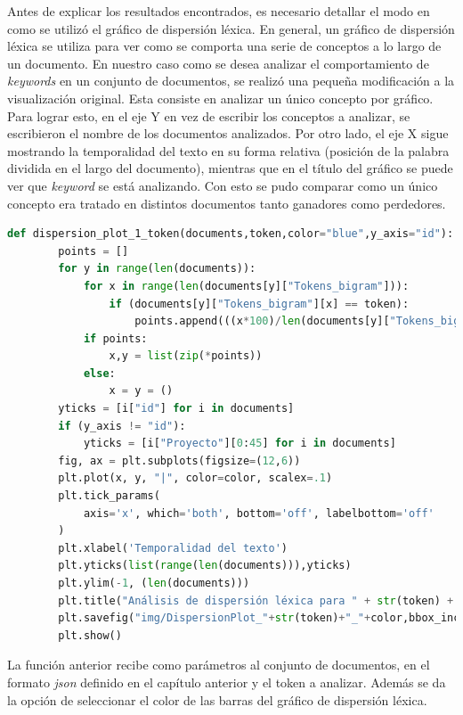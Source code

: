     Antes de explicar los resultados encontrados, es necesario detallar el modo en como se utilizó el gráfico de dispersión léxica. En general, un gráfico de dispersión léxica se utiliza para ver como se comporta una serie de conceptos a lo largo de un documento. En nuestro caso como se desea analizar el comportamiento de \textit{keywords} en un conjunto de documentos, se realizó una pequeña modificación a la visualización original. Esta consiste en analizar un único concepto por gráfico. Para lograr esto, en el eje Y en vez de escribir los conceptos a analizar, se escribieron el nombre de los documentos analizados. Por otro lado, el eje X sigue mostrando la temporalidad del texto en su forma relativa (posición de la palabra dividida en el largo del documento), mientras que en el título del gráfico se puede ver que \textit{keyword} se está analizando. Con esto se pudo comparar como un único concepto era tratado en distintos documentos tanto ganadores como perdedores.
    
    \begin{lstlisting}[language=Python]
    def dispersion_plot_1_token(documents,token,color="blue",y_axis="id"):
        points = []
        for y in range(len(documents)):
            for x in range(len(documents[y]["Tokens_bigram"])):
                if (documents[y]["Tokens_bigram"][x] == token):
                    points.append(((x*100)/len(documents[y]["Tokens_bigram"]),y))
            if points:
                x,y = list(zip(*points))
            else:
                x = y = ()
        yticks = [i["id"] for i in documents]
        if (y_axis != "id"):
            yticks = [i["Proyecto"][0:45] for i in documents]
        fig, ax = plt.subplots(figsize=(12,6))
        plt.plot(x, y, "|", color=color, scalex=.1)
        plt.tick_params(
            axis='x', which='both', bottom='off', labelbottom='off'
        )
        plt.xlabel('Temporalidad del texto')
        plt.yticks(list(range(len(documents))),yticks)
        plt.ylim(-1, (len(documents)))
        plt.title("Análisis de dispersión léxica para " + str(token) + " en propuestas " + documents[0]["Estado"]+"s")
        plt.savefig("img/DispersionPlot_"+str(token)+"_"+color,bbox_inches='tight')
        plt.show()
    \end{lstlisting}
    
    La función anterior recibe como parámetros al conjunto de documentos, en el formato \textit{json} definido en el capítulo anterior y el token a analizar. Además se da la opción de seleccionar el color de las barras del gráfico de dispersión léxica.
    
